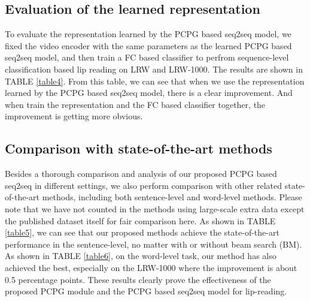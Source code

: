 \documentclass[a4paper, 10pt, conference]{ieeeconf}      %
\begin{document}
	\subsection{Evaluation of the learned representation}
	To evaluate the representation learned by the PCPG based seq2seq model, we fixed the video encoder with the same parameters as the learned PCPG based seq2seq model, and then train a FC based classifier to perfrom sequence-level classification based lip reading on LRW and LRW-1000. The results are shown in TABLE \ref{table4}. From this table, we can see that when we use the representation learned by  the PCPG based seq2seq model, there is a clear improvement. And when train the representation and the FC based classifier together, the improvement is getting more obvious.
	
	\subsection{Comparison with state-of-the-art  methods}
	Besides a thorough comparison and analysis of our proposed PCPG based seq2seq in different settings, we also perform comparison with other related state-of-the-art methods, including both sentence-level and word-level methods. Please note that we have not counted in the methods using large-scale extra data except the published dataset itself for fair comparison here. As shown in TABLE \ref{table5},  we can see that our proposed methods achieve the state-of-the-art performance in the sentence-level, no matter with or without beam search (BM). As shown in  TABLE \ref{table6}, on the word-level task, our method has also achieved the best, especially on the LRW-1000 where the improvement is about 0.5 percentage points. These results clearly prove the effectiveness of the proposed PCPG module and the PCPG based seq2seq model for lip-reading.
	
\end{document}
